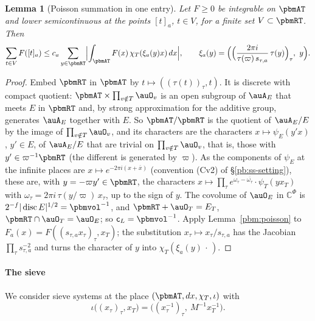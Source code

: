 \documentclass[10pt]{amsart}
\newtheorem{lemma}[theorem]{Lemma}
\theoremstyle{definition}
\theoremstyle{remark}
\newcommand{\C}{\mathbb C}
\providecommand{\auPl}{\Phi}
\providecommand{\aubar}[1]{\overline{#1}}
\begin{document}
\begin{lemma}[Poisson summation in one entry]\label{pbm:poissonT}
Let $F\ge0$ be integrable on $\pbmAT$ and lower semicontinuous at the points $[t]_a$, $t\in V$, for
a finite set $V\subset\pbmRT$. Then
\[
\sum_{t\in V}F([t]_a)\le c_a\sum_{y\in\pbmRT}\Bigl|\int_{\pbmAT}F(x)\,\chi_T(\xi_a(y)x)\,dx\Bigr|,\qquad
\xi_a(y)=\Bigl(\Bigl(\frac{2\pi i}{\tau(\varpi)\,s_{\tau,a}}\,\tau(y)\Bigr)_\tau,\ y\Bigr).
\]
\end{lemma}
\begin{proof}
Embed $\pbmRT$ in $\pbmAT$ by $t\mapsto((\tau(t))_\tau,t)$. It is discrete with compact quotient:
$\pbmAT\times\prod_{v\notin T}\auO_v$ is an open subgroup of $\auA_E$ that meets $E$ in $\pbmRT$ and,
by strong approximation for the additive group, generates $\auA_E$ together with $E$. So $\pbmAT/
\pbmRT$ is the quotient of $\auA_E/E$ by the image of $\prod_{v\notin T}\auO_v$, and its characters
are the characters $x\mapsto\psi_E(y'x)$, $y'\in E$, of $\auA_E/E$ that are trivial on $\prod_{v
\notin T}\auO_v$, that is, those with $y'\in\varpi^{-1}\pbmRT$ (the different is generated by
$\varpi$). As the components of $\psi_E$ at the infinite places are $x\mapsto e^{-2\pi i(x+\aubar x)}$
(convention (Cv2) of \S\ref{pb:ss-setting}), these are, with $y=-\varpi y'\in\pbmRT$, the characters $x\mapsto\prod_\tau e^{\omega_\tau-\aubar{
\omega_\tau}}\cdot\psi_T(yx_T)$ with $\omega_\tau=2\pi i\,\tau(y/\varpi)\,x_\tau$, up to the sign of
$y$. The covolume of $\auO_E$ in $\C^{\auPl}$ is
$2^{-f}|\operatorname{disc}E|^{1/2}=\pbmvol^{-1}$, and $\pbmRT+\auO_T=E_T$, $\pbmRT\cap\auO_T=\auO_E$; so
$\mathsf c_L=\pbmvol^{-1}$. Apply Lemma~\ref{pbm:poisson} to $F_a(x)=F((s_{\tau,a}x_\tau)_\tau,x_T)$;
the substitution $x_\tau\mapsto x_\tau/s_{\tau,a}$ has the Jacobian $\prod_\tau s_{\tau,a}^{-2}$ and
turns the character of $y$ into $\chi_T(\xi_a(y)\,\cdot\,)$.
\end{proof}

\paragraph*{The sieve}
We consider sieve systems at the place $(\pbmAT,dx,\chi_T,\iota)$ with
\begin{equation}\label{pbm:eq-iota}
\iota\bigl((x_\tau)_\tau,x_T\bigr)=\bigl((x_\tau^{-1})_\tau,\ M^{-1}x_T^{-1}\bigr).
\end{equation}
\end{document}
